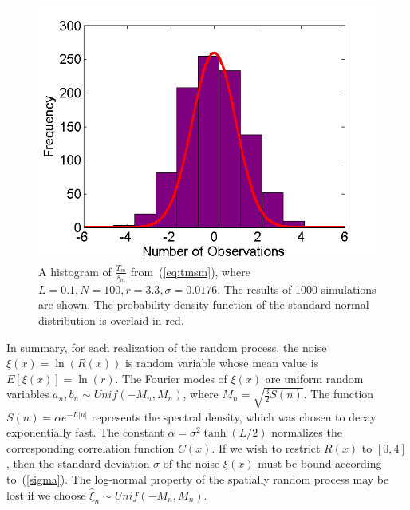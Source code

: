 \begin{figure}[!h]
\caption[A histogram of $\frac{T_m}{s_m}$]{A histogram of
  $\frac{T_m}{s_m}$ from~(\ref{eq:tmsm}), where $L=0.1,N = 100, r =
  3.3, \sigma=0.0176$. The results of 1000 simulations are shown. The probability
  density function of the standard normal distribution is
overlaid in red.}\label{fig:tmsm}
	\begin{center}
		\includegraphics[scale=0.6]{figs/tmsm.png}
	\end{center}
\end{figure}

In summary, for each realization of the random process, the noise
$\xi(x)=\ln(R(x))$ is random variable whose mean value is
$E[\xi(x)]=\ln(r)$. The Fourier modes of $\xi(x)$ are uniform random
variables $a_n,b_n \sim Unif(-M_n,M_n)$, where $M_n=
\sqrt{\frac{3}{2}S(n)}$. The function $S(n)=\alpha e^{-L|n|}$
represents the spectral density, which was chosen to decay exponentially fast. The constant $\alpha = \sigma^2 \tanh(L/2)$ normalizes the corresponding
correlation function $C(x)$. If we wish to restrict $R(x)$
to $[0,4]$, then the standard deviation $\sigma$ of
the noise $\xi(x)$ must be bound according to~(\ref{sigma}). The
log-normal property of the spatially random process may be lost if we
choose $\hat{\xi}_n \sim Unif(-M_n,M_n)$.  

